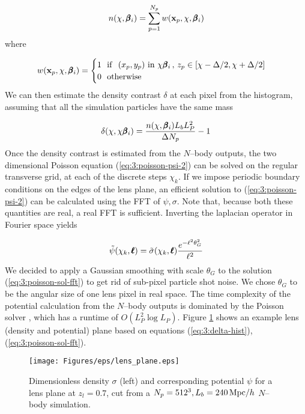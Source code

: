 \begin{equation}
\label{eq:3:number-hist}
n(\chi, \pmb{\beta}_i) = \sum_{p=1}^{N_p}w(\mathbf{x}_p,\chi,\pmb{\beta}_i)
\end{equation}  
%
where 

\begin{equation}
\label{eq:3:number-kernel}
w(\mathbf{x}_p,\chi,\pmb{\beta}_i) = 
\begin{cases}
1 \,\,\,\, {\rm if} \,\,\,\, (x_p,y_p) \,\, {\rm in} \,\, \chi\pmb{\beta}_i \, , \, z_p\in [\chi-\Delta/2,\chi+\Delta/2] \\
0 \,\,\,\, {\rm otherwise}
\end{cases}
\end{equation}
%
We can then estimate the density contrast $\delta$ at each pixel from the histogram, assuming that all the simulation particles have the same mass

\begin{equation}
\label{eq:3:delta-hist}
\delta(\chi,\chi\pmb{\beta}_i) = \frac{n(\chi,\pmb{\beta}_i)L_bL_P^2 }{\Delta N_p} - 1
\end{equation}
%
Once the density contrast is estimated from the $N$--body outputs, the two dimensional Poisson equation (\ref{eq:3:poisson-psi-2}) can be solved on the regular transverse grid, at each of the discrete steps $\chi_k$. If we impose periodic boundary conditions on the edges of the lens plane, an efficient solution to (\ref{eq:3:poisson-psi-2}) can be calculated using the FFT of $\psi,\sigma$. Note that, because both these quantities are real, a real FFT is sufficient. Inverting the laplacian operator in Fourier space yields

\begin{equation}
\label{eq:3:poisson-sol-fft}
\tilde{\psi}(\chi_k,\pmb{\ell}) = \tilde{\sigma}(\chi_k,\pmb{\ell})\frac{e^{-\ell^2\theta_G^2}}{\ell^2}
\end{equation} 
%
We decided to apply a Gaussian smoothing with scale $\theta_G$ to the solution (\ref{eq:3:poisson-sol-fft}) to get rid of sub-pixel particle shot noise. We chose $\theta_G$ to be the angular size of one lens pixel in real space. The time complexity of the potential calculation from the $N$--body outputs is dominated by the Poisson solver \citep{lenstools}, which has a runtime of $O(L_P^2\log L_P)$. Figure \ref{fig:3:lens} shows an example lens (density and potential) plane based on equations (\ref{eq:3:delta-hist}), (\ref{eq:3:poisson-sol-fft}). 

\begin{figure}
\begin{center}
\texttt{[image: Figures/eps/lens\_plane.eps]}
\end{center}
\caption{Dimensionless density $\sigma$ (left) and corresponding potential $\psi$ for a lens plane at $z_l=0.7$, cut from a $N_p=512^3, L_b=240\,{\rm Mpc}/h$ $N$--body simulation.}
\label{fig:3:lens}
\end{figure}

